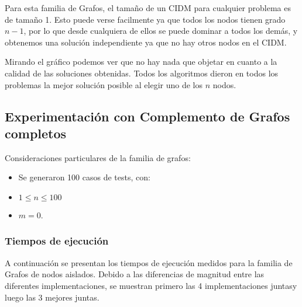 Para esta familia de Grafos, el tamaño de un CIDM para cualquier problema es de tamaño 1. Esto puede verse facilmente ya que todos los nodos tienen grado $n-1$, por lo que desde cualquiera de ellos se puede dominar a todos los demás, y obtenemos una solución independiente ya que no hay otros nodos en el CIDM.

Mirando el gráfico podemos ver que no hay nada que objetar en cuanto a la calidad de las soluciones obtenidas. Todos los algoritmos dieron en todos los problemas la mejor solución posible al elegir uno de los $n$ nodos.

\subsection{Experimentación con Complemento de Grafos completos}

Consideraciones particulares de la familia de grafos:
\begin{itemize}
    \item Se generaron 100 casos de tests, con:
    \item $1 \leq n \leq 100$
    \item $m = 0$.
\end{itemize}

\subsubsection{Tiempos de ejecución}

A continuación se presentan los tiempos de ejecución medidos para la familia de Grafos de nodos aislados. Debido a las diferencias de magnitud entre las diferentes implementaciones, se muestran primero las 4 implementaciones juntasy  luego las 3 mejores juntas.

